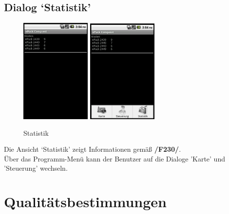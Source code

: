 \documentclass[10pt,a4paper]{article}
\let\oldsection\section
\renewcommand{\section}{\newpage \oldsection}
\begin{document}
			\subsection{Dialog `Statistik'}
				\begin{figure}[h]
					  \centering
					\includegraphics[width=3.5cm]{screenshots_neu/stats_bmp.png}
					\includegraphics[width=3.5cm]{screenshots_neu/stats_menu.png}
  					\caption{Statistik}
  				\end{figure}		
  				
  			Die Ansicht `Statistik' zeigt Informationen gemäß \textbf{/F230/}. \\
  			
  			Über das Programm-Menü kann der Benutzer auf die Dialoge 'Karte' und 'Steuerung' wechseln.
			
	\section{Qualitätsbestimmungen}
		
\end{document}
